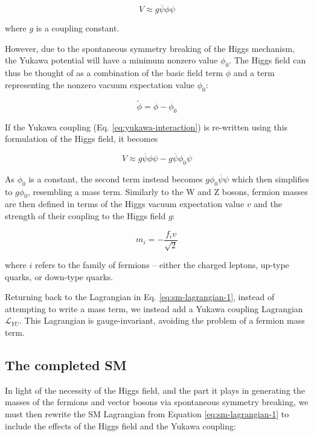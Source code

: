 \begin{equation}
	V \approx g \overline{\psi} \phi \psi
\label{eq:yukawa-interaction}
\end{equation}

where $g$ is a coupling constant.

However, due to the spontaneous symmetry breaking of the Higgs mechanism, the Yukawa potential will have a minimum nonzero value $\phi_0$. The Higgs field can thus be thought of as a combination of the basic field term $\phi$ and a term representing the nonzero vacuum expectation value $\phi_0$:

\begin{equation}
	\tilde{\phi} = \phi - \phi_0
\end{equation}

If the Yukawa coupling (Eq. \ref{eq:yukawa-interaction}) is re-written using this formulation of the Higgs field, it becomes

\begin{equation}
	V \approx g \overline{\psi} \phi \psi - g \overline{\psi} \phi_0 \psi
\end{equation}

As $\phi_0$ is a constant, the second term instead becomes $g \phi_0 \overline{\psi} \psi$ which then simplifies to $g \phi_0$, resembling a mass term. Similarly to the W and Z bosons, fermion masses are then defined in terms of the Higgs vacuum expectation value $v$ and the strength of their coupling to the Higgs field $g$:

\begin{equation}
	m_i = -\frac{f_i v}{\sqrt{2}}
\end{equation}

where $i$ refers to the family of fermions -- either the charged leptons, up-type quarks, or down-type quarks.

Returning back to the Lagrangian in Eq. \ref{eq:sm-lagrangian-1}, instead of attempting to write a mass term, we instead add a Yukawa coupling Lagrangian $\mathcal{L}_{YU}$. This Lagrangian is gauge-invariant, avoiding the problem of a fermion mass term.

\subsection{The completed \acrlong{SM}}
In light of the necessity of the Higgs field, and the part it plays in generating the masses of the fermions and vector bosons via spontaneous symmetry breaking, we must then rewrite the \acrshort{SM} Lagrangian from Equation \ref{eq:sm-lagrangian-1} to include the effects of the Higgs field and the Yukawa coupling:

